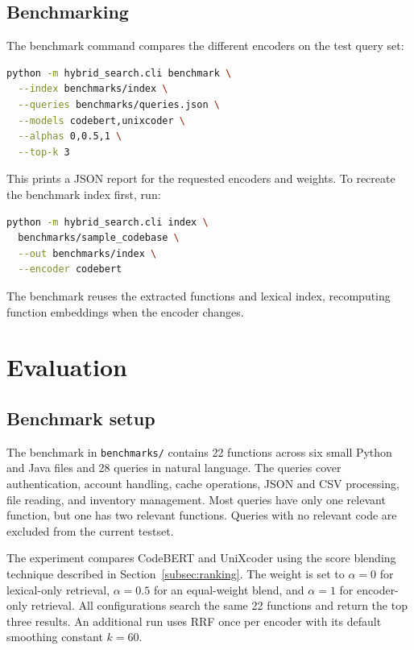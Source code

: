 \documentclass[12pt]{article}
\begin{document}
\subsection{Benchmarking}
\label{subsec:benchmarking}

The benchmark command compares the different encoders on the test query set:

\begin{lstlisting}[language=bash]
python -m hybrid_search.cli benchmark \
  --index benchmarks/index \
  --queries benchmarks/queries.json \
  --models codebert,unixcoder \
  --alphas 0,0.5,1 \
  --top-k 3
\end{lstlisting}

This prints a JSON report for the requested encoders and weights. To recreate the benchmark index first, run:

\begin{lstlisting}[language=bash]
python -m hybrid_search.cli index \
  benchmarks/sample_codebase \
  --out benchmarks/index \
  --encoder codebert
\end{lstlisting}

The benchmark reuses the extracted functions and lexical index, recomputing function embeddings when the encoder changes.

\section{Evaluation}
\label{sec:evaluation}

\subsection{Benchmark setup}
\label{subsec:benchmark-setup}

The benchmark in \texttt{benchmarks/} contains 22 functions across six small Python and Java files and
28 queries in natural language. The queries cover authentication, account handling, cache operations,
JSON and CSV processing, file reading, and inventory management.
Most queries have only one relevant function, but one has two relevant functions. Queries with no relevant code are
excluded from the current testset.

The experiment compares CodeBERT and UniXcoder using the score blending technique described in Section~\ref{subsec:ranking}.
The weight is set to \(\alpha=0\) for lexical-only retrieval, \(\alpha=0.5\) for an equal-weight blend,
and \(\alpha=1\) for encoder-only retrieval.
All configurations search the same 22 functions and return the top three results.
An additional run uses RRF once per encoder with its default smoothing constant \(k=60\).
\end{document}
